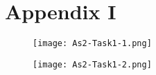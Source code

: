 \pagebreak

\section*{Appendix I}
\begin{figure}[h!]
        \centering
        \texttt{[image: As2-Task1-1.png]}
\end{figure}

\pagebreak

\begin{figure}[h!]
        \centering
        \texttt{[image: As2-Task1-2.png]}
\end{figure}
